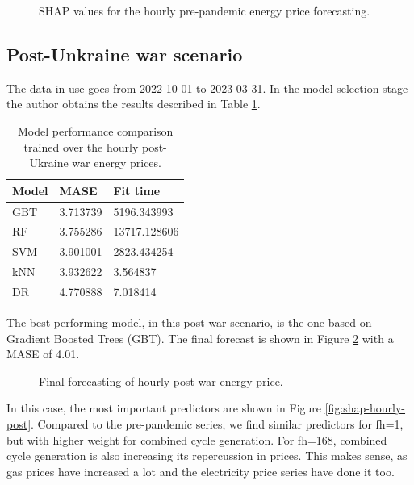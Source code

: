 \begin{figure}[H]
    \caption{SHAP values for the hourly pre-pandemic energy price forecasting.}
    \label{fig:shap-hourly-pre}
\end{figure}

\subsection{Post-Unkraine war scenario}
The data in use goes from 2022-10-01 to 2023-03-31. In the model selection stage the author obtains the results described in Table \ref{tab:cv-hourly-post}.

\begin{table}[H]
\centering
\begin{tabular}{@{}l|l|l@{}}
\toprule
Model & MASE     & Fit time     \\ \midrule
GBT   & 3.713739 & 5196.343993  \\
RF    & 3.755286 & 13717.128606 \\
SVM   & 3.901001 & 2823.434254  \\
kNN   & 3.932622 & 3.564837     \\
DR    & 4.770888 & 7.018414     \\ \bottomrule
\end{tabular}
\caption{Model performance comparison trained over the hourly post-Ukraine war energy prices.}
\label{tab:cv-hourly-post}
\end{table}

The best-performing model, in this post-war scenario, is the one based on Gradient Boosted Trees (GBT). The final forecast is shown in Figure \ref{fig:forecast-hourly-post} with a MASE of 4.01.

\begin{figure}[H]
\centering
    \caption{Final forecasting of hourly post-war energy price.}
    \label{fig:forecast-hourly-post}
\end{figure}

In this case, the most important predictors are shown in Figure \ref{fig:shap-hourly-post}. Compared to the pre-pandemic series, we find similar predictors for fh=1, but with higher weight for combined cycle generation. For fh=168, combined cycle generation is also increasing its repercussion in prices. This makes sense, as gas prices have increased a lot and the electricity price series have done it too.

